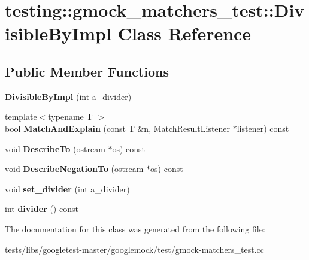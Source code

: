\hypertarget{classtesting_1_1gmock__matchers__test_1_1DivisibleByImpl}{}\section{testing\+:\+:gmock\+\_\+matchers\+\_\+test\+:\+:Divisible\+By\+Impl Class Reference}
\label{classtesting_1_1gmock__matchers__test_1_1DivisibleByImpl}
\subsection*{Public Member Functions}
\begin{DoxyCompactItemize}
\item 
\mbox{\label{classtesting_1_1gmock__matchers__test_1_1DivisibleByImpl_aab5d8d383a8cbf112fe087c4f0f3f699}} 
{\bfseries Divisible\+By\+Impl} (int a\+\_\+divider)
\item 
\mbox{\label{classtesting_1_1gmock__matchers__test_1_1DivisibleByImpl_a2621df4b34315b327e20b6f4d901417d}} 
{\footnotesize template$<$typename T $>$ }\\bool {\bfseries Match\+And\+Explain} (const T \&n, Match\+Result\+Listener $\ast$listener) const
\item 
\mbox{\label{classtesting_1_1gmock__matchers__test_1_1DivisibleByImpl_aabd14d5f96ef6851141d9ed9fbee3f86}} 
void {\bfseries Describe\+To} (ostream $\ast$os) const
\item 
\mbox{\label{classtesting_1_1gmock__matchers__test_1_1DivisibleByImpl_a9c061ef411c126c604d4c33d92911d50}} 
void {\bfseries Describe\+Negation\+To} (ostream $\ast$os) const
\item 
\mbox{\label{classtesting_1_1gmock__matchers__test_1_1DivisibleByImpl_a86c8787ab835bc84a9ad7e3931d644cc}} 
void {\bfseries set\+\_\+divider} (int a\+\_\+divider)
\item 
\mbox{\label{classtesting_1_1gmock__matchers__test_1_1DivisibleByImpl_afaf102bc25623966dd11805b62e42321}} 
int {\bfseries divider} () const
\end{DoxyCompactItemize}


The documentation for this class was generated from the following file\+:\begin{DoxyCompactItemize}
\item 
tests/libs/googletest-\/master/googlemock/test/gmock-\/matchers\+\_\+test.\+cc\end{DoxyCompactItemize}
